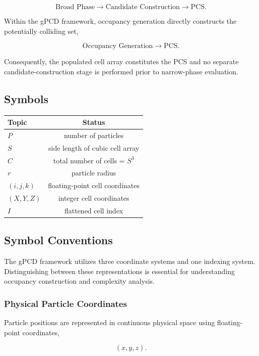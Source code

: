 \begin{equation}
\text{Broad Phase}
\rightarrow
\text{Candidate Construction}
\rightarrow
\text{PCS}.
\end{equation}

Within the gPCD framework, occupancy generation directly constructs the
potentially colliding set,

\begin{equation}
\text{Occupancy Generation}
\rightarrow
\text{PCS}.
\end{equation}

Consequently, the populated cell array constitutes the PCS and no
separate candidate-construction stage is performed prior to
narrow-phase evaluation.

\subsection{Symbols}
\begin{tabular}{|l|c|}
\hline
Topic & Status \\
\hline
$P$ & number of particles\\
$S$ & side length of cubic cell array\\
$C$ & total number of cells = $S^3$\\
$r$ & particle radius\\
$(i,j,k)$ & floating-point cell coordinates\\
$(X,Y,Z)$ & integer cell coordinates\\
$I$ & flattened cell index\\
\hline
\end{tabular}

\subsection{Symbol Conventions}

The gPCD framework utilizes three coordinate systems and one indexing
system. Distinguishing between these representations is essential for
understanding occupancy construction and complexity analysis.

\subsubsection{Physical Particle Coordinates}

Particle positions are represented in continuous physical space using
floating-point coordinates,

\begin{equation}
(x,y,z).
\end{equation}

